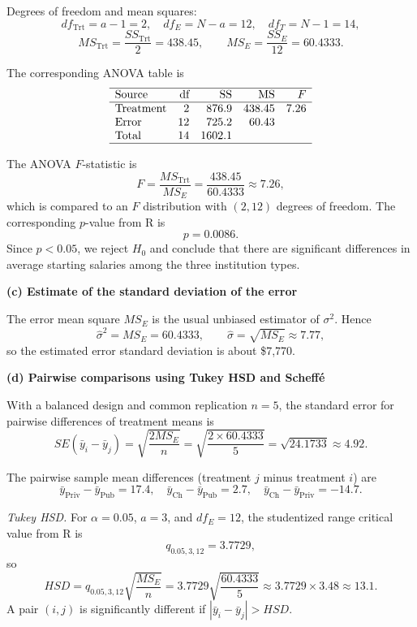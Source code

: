 \documentclass[answers,12pt,addpoints]{exam}
\begin{document}
Degrees of freedom and mean squares:
\[
df_{\text{Trt}} = a-1 = 2,\quad
df_E = N-a = 12,\quad
df_T = N-1 = 14,
\]
\[
MS_{\text{Trt}} = \frac{SS_{\text{Trt}}}{2} = 438.45,\qquad
MS_E = \frac{SS_E}{12} = 60.4333.
\]

The corresponding ANOVA table is
\[
\begin{array}{lrrrr}
\hline
\text{Source} & \text{df} & \text{SS} & \text{MS} & F \\
\hline
\text{Treatment} & 2  & 876.9 & 438.45 & 7.26 \\
\text{Error}     & 12 & 725.2 & 60.43  &      \\
\text{Total}     & 14 & 1602.1&        &      \\
\hline
\end{array}
\]

The ANOVA $F$-statistic is
\[
F = \frac{MS_{\text{Trt}}}{MS_E}
= \frac{438.45}{60.4333} \approx 7.26,
\]
which is compared to an $F$ distribution with $(2,12)$ degrees of freedom.
The corresponding $p$-value from R is
\[
p = 0.0086.
\]
Since $p < 0.05$, we reject $H_0$ and conclude that there are significant
differences in average starting salaries among the three institution types.

\medskip
\textbf{(c) Estimate of the standard deviation of the error}

The error mean square $MS_E$ is the usual unbiased estimator of $\sigma^2$.
Hence
\[
\hat{\sigma}^2 = MS_E = 60.4333,
\qquad
\hat{\sigma} = \sqrt{MS_E} \approx 7.77,
\]
so the estimated error standard deviation is about \$7{,}770.

\medskip
\textbf{(d) Pairwise comparisons using Tukey HSD and Scheff\'e}

With a balanced design and common replication $n=5$, the standard error for
pairwise differences of treatment means is
\[
SE(\bar{y}_i - \bar{y}_j) =
\sqrt{\frac{2 MS_E}{n}}
= \sqrt{\frac{2 \times 60.4333}{5}}
= \sqrt{24.1733} \approx 4.92.
\]

The pairwise sample mean differences (treatment $j$ minus treatment $i$) are
\[
\bar{y}_{\text{Priv}} - \bar{y}_{\text{Pub}} = 17.4,\quad
\bar{y}_{\text{Ch}}   - \bar{y}_{\text{Pub}} = 2.7,\quad
\bar{y}_{\text{Ch}}   - \bar{y}_{\text{Priv}} = -14.7.
\]

\emph{Tukey HSD.}
For $\alpha = 0.05$, $a = 3$, and $df_E = 12$, the studentized range critical
value from R is
\[
q_{0.05,3,12} = 3.7729,
\]
so
\[
HSD = q_{0.05,3,12}\sqrt{\frac{MS_E}{n}}
= 3.7729 \sqrt{\frac{60.4333}{5}}
\approx 3.7729 \times 3.48 \approx 13.1.
\]
A pair $(i,j)$ is significantly different if $|\bar{y}_i - \bar{y}_j| > HSD$.
\end{document}

